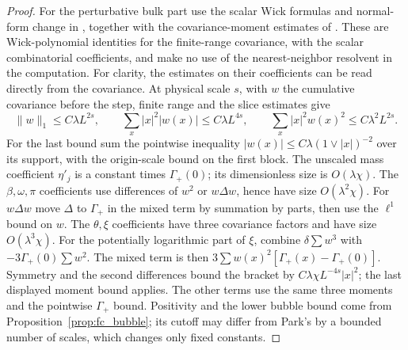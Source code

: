 \documentclass[11pt]{article}
\begin{document}
\begin{proof}
For the perturbative bulk part use the scalar Wick formulas and normal-form change in
\cite[Section 3.2, especially (3.16)--(3.26) and (3.33) onwards]{BBSModel},
together with the covariance-moment estimates of
\cite[Sections 3--4]{BBSIII}. These are Wick-polynomial identities
for the finite-range covariance, with the scalar
combinatorial coefficients, and make no use of the
nearest-neighbor resolvent in the computation. For
clarity, the estimates on their coefficients can
be read directly from the covariance. At physical
scale \(s\), with \(w\) the cumulative covariance
before the step, finite range and the slice estimates
give
\[
 \|w\|_1\le C\lambda L^{2s},\qquad
 \sum_x |x|^2|w(x)|\le C\lambda L^{4s},\qquad
 \sum_x |x|^2w(x)^2\le C\lambda^2L^{2s}.
\]
For the last bound sum the pointwise inequality
\(|w(x)|\le C\lambda(1\vee|x|)^{-2}\) over its support,
with the origin-scale bound on the first block.
The unscaled mass coefficient \(\eta'_j\) is a
constant times \(\Gamma_+(0)\); its dimensionless
size is \(O(\lambda\chi)\).
The \(\beta,\omega,\pi\) coefficients use
differences of \(w^2\) or \(w\Delta w\), hence have
size \(O(\lambda^2\chi)\). For \(w\Delta w\)
move \(\Delta\) to \(\Gamma_+\) in the mixed term
by summation by parts, then use the \(\ell^1\)
bound on \(w\). The \(\theta,\xi\) coefficients
have three covariance factors and have size
\(O(\lambda^3\chi)\). For the potentially
logarithmic part of \(\xi\), combine
\(\delta\sum w^3\) with
\(-3\Gamma_+(0)\sum w^2\). The mixed term is then
\(3\sum w(x)^2[\Gamma_+(x)-\Gamma_+(0)]\).
Symmetry and the second differences bound the
bracket by \(C\lambda\chi L^{-4s}|x|^2\);
the last displayed moment bound applies.
The other terms use the same three moments
and the pointwise \(\Gamma_+\) bound.
Positivity and the lower bubble bound come from
Proposition~\ref{prop:fc_bubble}; its cutoff may
differ from Park's by a bounded number of scales,
which changes only fixed constants.


\end{proof}
\end{document}
